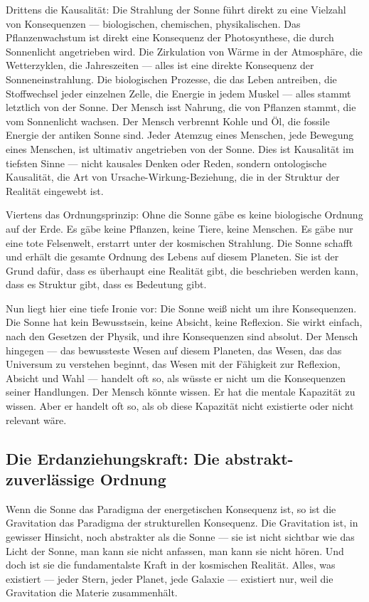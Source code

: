 \documentclass[12pt,a4paper]{article}
\begin{document}
Drittens die Kausalität: Die Strahlung der Sonne führt direkt zu eine Vielzahl von Konsequenzen — biologischen, chemischen, physikalischen. Das Pflanzenwachstum ist direkt eine Konsequenz der Photosynthese, die durch Sonnenlicht angetrieben wird. Die Zirkulation von Wärme in der Atmosphäre, die Wetterzyklen, die Jahreszeiten — alles ist eine direkte Konsequenz der Sonneneinstrahlung. Die biologischen Prozesse, die das Leben antreiben, die Stoffwechsel jeder einzelnen Zelle, die Energie in jedem Muskel — alles stammt letztlich von der Sonne. Der Mensch isst Nahrung, die von Pflanzen stammt, die vom Sonnenlicht wachsen. Der Mensch verbrennt Kohle und Öl, die fossile Energie der antiken Sonne sind. Jeder Atemzug eines Menschen, jede Bewegung eines Menschen, ist ultimativ angetrieben von der Sonne. Dies ist Kausalität im tiefsten Sinne — nicht kausales Denken oder Reden, sondern ontologische Kausalität, die Art von Ursache-Wirkung-Beziehung, die in der Struktur der Realität eingewebt ist.

Viertens das Ordnungsprinzip: Ohne die Sonne gäbe es keine biologische Ordnung auf der Erde. Es gäbe keine Pflanzen, keine Tiere, keine Menschen. Es gäbe nur eine tote Felsenwelt, erstarrt unter der kosmischen Strahlung. Die Sonne schafft und erhält die gesamte Ordnung des Lebens auf diesem Planeten. Sie ist der Grund dafür, dass es überhaupt eine Realität gibt, die beschrieben werden kann, dass es Struktur gibt, dass es Bedeutung gibt.

Nun liegt hier eine tiefe Ironie vor: Die Sonne weiß nicht um ihre Konsequenzen. Die Sonne hat kein Bewusstsein, keine Absicht, keine Reflexion. Sie wirkt einfach, nach den Gesetzen der Physik, und ihre Konsequenzen sind absolut. Der Mensch hingegen — das bewussteste Wesen auf diesem Planeten, das Wesen, das das Universum zu verstehen beginnt, das Wesen mit der Fähigkeit zur Reflexion, Absicht und Wahl — handelt oft so, als wüsste er nicht um die Konsequenzen seiner Handlungen. Der Mensch könnte wissen. Er hat die mentale Kapazität zu wissen. Aber er handelt oft so, als ob diese Kapazität nicht existierte oder nicht relevant wäre.

\subsection{Die Erdanziehungskraft: Die abstrakt-zuverlässige Ordnung}

Wenn die Sonne das Paradigma der energetischen Konsequenz ist, so ist die Gravitation das Paradigma der strukturellen Konsequenz. Die Gravitation ist, in gewisser Hinsicht, noch abstrakter als die Sonne — sie ist nicht sichtbar wie das Licht der Sonne, man kann sie nicht anfassen, man kann sie nicht hören. Und doch ist sie die fundamentalste Kraft in der kosmischen Realität. Alles, was existiert — jeder Stern, jeder Planet, jede Galaxie — existiert nur, weil die Gravitation die Materie zusammenhält.
\end{document}
